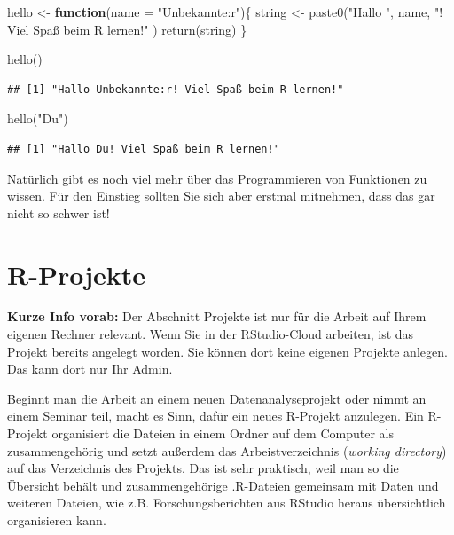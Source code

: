 \documentclass[
]{book}
\newenvironment{Shaded}{\begin{snugshade}}{\end{snugshade}}
\newcommand{\AttributeTok}[1]{\textcolor[rgb]{0.77,0.63,0.00}{#1}}
\newcommand{\ControlFlowTok}[1]{\textcolor[rgb]{0.13,0.29,0.53}{\textbf{#1}}}
\newcommand{\FunctionTok}[1]{\textcolor[rgb]{0.00,0.00,0.00}{#1}}
\newcommand{\NormalTok}[1]{#1}
\newcommand{\OtherTok}[1]{\textcolor[rgb]{0.56,0.35,0.01}{#1}}
\newcommand{\StringTok}[1]{\textcolor[rgb]{0.31,0.60,0.02}{#1}}
\begin{document}
\begin{Shaded}
\begin{Highlighting}[]
\NormalTok{hello }\OtherTok{\textless{}{-}} \ControlFlowTok{function}\NormalTok{(}\AttributeTok{name =} \StringTok{"Unbekannte:r"}\NormalTok{)\{}
\NormalTok{  string }\OtherTok{\textless{}{-}} \FunctionTok{paste0}\NormalTok{(}\StringTok{"Hallo "}\NormalTok{, name, }\StringTok{"! Viel Spaß beim R lernen!"}\NormalTok{ )}
  \FunctionTok{return}\NormalTok{(string)}
\NormalTok{\}}
\end{Highlighting}
\end{Shaded}

\begin{Shaded}
\begin{Highlighting}[]
\FunctionTok{hello}\NormalTok{()}
\end{Highlighting}
\end{Shaded}

\begin{verbatim}
## [1] "Hallo Unbekannte:r! Viel Spaß beim R lernen!"
\end{verbatim}

\begin{Shaded}
\begin{Highlighting}[]
\FunctionTok{hello}\NormalTok{(}\StringTok{"Du"}\NormalTok{)}
\end{Highlighting}
\end{Shaded}

\begin{verbatim}
## [1] "Hallo Du! Viel Spaß beim R lernen!"
\end{verbatim}

Natürlich gibt es noch viel mehr über das Programmieren von Funktionen zu wissen. Für den Einstieg sollten Sie sich aber erstmal mitnehmen, dass das gar nicht so schwer ist!

\hypertarget{r-projekte}{%
\section{R-Projekte}\label{r-projekte}}

\textbf{Kurze Info vorab:} Der Abschnitt Projekte ist nur für die Arbeit auf Ihrem eigenen Rechner relevant. Wenn Sie in der RStudio-Cloud arbeiten, ist das Projekt bereits angelegt worden. Sie können dort keine eigenen Projekte anlegen. Das kann dort nur Ihr Admin.

Beginnt man die Arbeit an einem neuen Datenanalyseprojekt oder nimmt an einem Seminar teil, macht es Sinn, dafür ein neues R-Projekt anzulegen. Ein R-Projekt organisiert die Dateien in einem Ordner auf dem Computer als zusammengehörig und setzt außerdem das Arbeistverzeichnis (\emph{working directory}) auf das Verzeichnis des Projekts. Das ist sehr praktisch, weil man so die Übersicht behält und zusammengehörige .R-Dateien gemeinsam mit Daten und weiteren Dateien, wie z.B. Forschungsberichten aus RStudio heraus übersichtlich organisieren kann.
\end{document}
